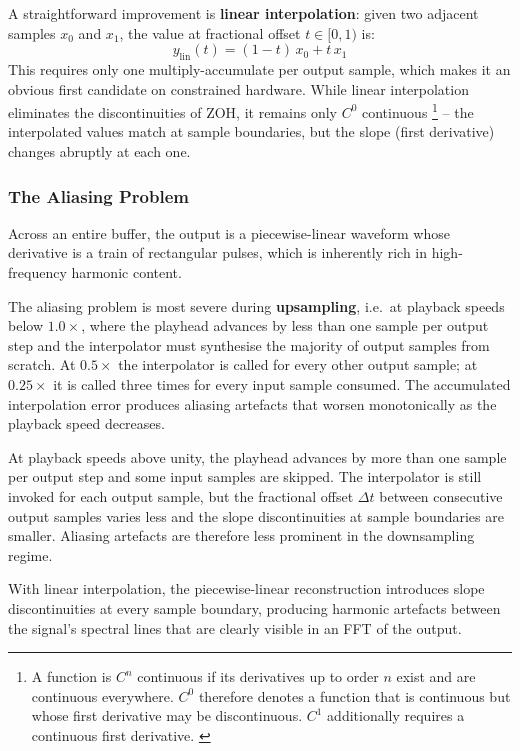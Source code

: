 A straightforward improvement is \textbf{linear interpolation}: given two adjacent 
samples $x_0$ and $x_1$, the value at fractional offset $t \in [0, 1)$ is:
\begin{equation}
y_{\text{lin}}(t) = (1 - t)\, x_0 + t\, x_1
\end{equation}
This requires only one multiply-accumulate per output sample, which makes it an 
obvious first candidate on constrained hardware. While linear interpolation eliminates 
the discontinuities of ZOH, it remains only $C^0$ continuous 
\footnote{A function is $C^n$ continuous if its derivatives up to order $n$ exist and are continuous everywhere. $C^0$ therefore denotes a function that is continuous but whose first derivative may be discontinuous. $C^1$ additionally requires a continuous first derivative. \cite{weissteinSmoothFunction}} 
-- the interpolated values match at sample boundaries, but the slope (first derivative) changes abruptly at each one.

\subsubsection{The Aliasing Problem}

Across an entire buffer, the output is a piecewise-linear waveform whose derivative is a train of rectangular pulses, which is inherently rich in high-frequency harmonic content.

The aliasing problem is most severe during \textbf{upsampling}, i.e.\ at playback speeds below $1.0\times$, where the playhead advances by less than one sample per output step and the interpolator must synthesise the majority of output samples from scratch. At $0.5\times$ the interpolator is called for every other output sample; at $0.25\times$ it is called three times for every input sample consumed. 
The accumulated interpolation error produces aliasing artefacts that worsen monotonically as the playback speed decreases.

At playback speeds above unity, the playhead advances by more than one sample per output step and some input samples are skipped. 
The interpolator is still invoked for each output sample, but the fractional offset $\Delta t$ between consecutive output samples varies less and the slope discontinuities at sample boundaries are smaller. Aliasing artefacts are therefore less prominent in the downsampling regime.

With linear interpolation, the piecewise-linear reconstruction introduces slope discontinuities at every sample boundary, producing harmonic artefacts between the signal's spectral lines that are clearly visible in an \ac{FFT} of the output.

